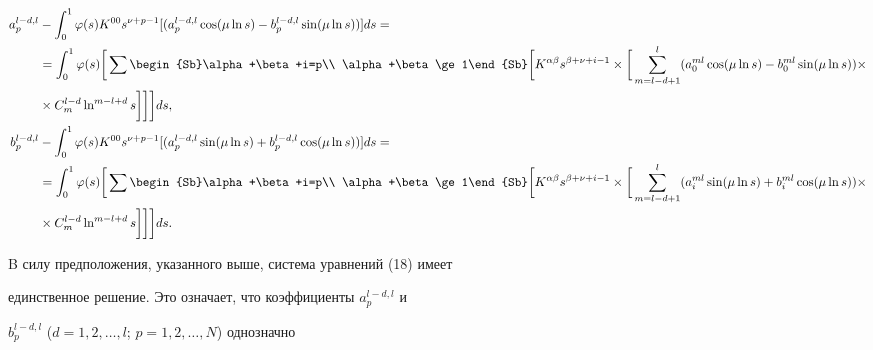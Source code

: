 \begin{equation} 


\begin{split} 


a^{l-d,l}_p&-\int^1_0\varphi(s)K^{00}s^{\nu+p-1} 


[(a^{l-d,l}_p\cos(\mu\ln s)-b^{l-d,l}_p\sin(\mu\ln s))]ds=\\ 


&=\int^1_0\varphi(s)\bigg[\sum\begin{Sb}\alpha+\beta+i=p\\ 


\alpha+\beta\ge1\end{Sb}\bigg[K^{\alpha\beta} 


s^{\beta+\nu+i-1}\times\bigg[\sum^l_{m=l-d+1} 


(a^{ml}_0\cos(\mu\ln s)-b^{ml}_0\sin(\mu\ln s)) \times\\


&\times C^{l-d}_m\ln^{m-l+d}s\bigg]\bigg]\bigg]ds,\\ 


% 


b^{l-d,l}_p&-\int^1_0\varphi(s)K^{00}s^{\nu+p-1}[ 


(a^{l-d,l}_p\sin(\mu\ln s)+b^{l-d,l}_p\cos(\mu\ln s))]ds=\\ 


&=\int^1_0\varphi(s)\bigg[\sum\begin{Sb}\alpha+\beta+i=p\\ 


\alpha+\beta\ge1\end{Sb}\bigg[K^{\alpha\beta} 


s^{\beta+\nu+i-1}\times\bigg[\sum^l_{m=l-d+1} 


(a^{ml}_i\sin(\mu\ln s)+b^{ml}_i\cos(\mu\ln s)) \times\\


&\times C^{l-d}_m\ln^{m-l+d}s\bigg]\bigg]\bigg]ds. 


\end{split} 


\end{equation} 


 


B силу предположения, указанного выше, система уравнений (18) имеет 


единственное решение. Это означает, что коэффициенты $a^{l-d,l}_p$ и 


$b^{l-d,l}_p$ ($d=1,2,\dotsc,l$; $p=1,2,\dotsc,N$) однозначно 


